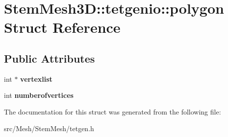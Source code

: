 \hypertarget{structStemMesh3D_1_1tetgenio_1_1polygon}{}\section{Stem\+Mesh3D\+:\+:tetgenio\+:\+:polygon Struct Reference}
\label{structStemMesh3D_1_1tetgenio_1_1polygon}
\subsection*{Public Attributes}
\begin{DoxyCompactItemize}
\item 
\mbox{\label{structStemMesh3D_1_1tetgenio_1_1polygon_a7a9745e3196d1e72a98e30434a6458a4}} 
int $\ast$ {\bfseries vertexlist}
\item 
\mbox{\label{structStemMesh3D_1_1tetgenio_1_1polygon_a1b49dd248dd959716f6d962d5745328f}} 
int {\bfseries numberofvertices}
\end{DoxyCompactItemize}


The documentation for this struct was generated from the following file\+:\begin{DoxyCompactItemize}
\item 
src/\+Mesh/\+Stem\+Mesh/tetgen.\+h\end{DoxyCompactItemize}
